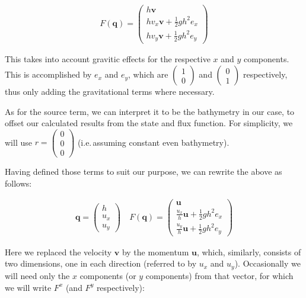 \documentclass{article}
\begin{document}
\begin{eqnarray*}
  F(\mathbf{q}) =
  \begin{pmatrix}
    h \mathbf{v} \\ h v_x \mathbf{v} + \frac{1}{2} g h^2 e_x \\ h v_y \mathbf{v} + \frac{1}{2} g h^2 e_y
  \end{pmatrix}
\end{eqnarray*}

This takes into account gravitic effects for the respective $x$ and $y$ components. This is accomplished by $e_x$ and $e_y$, which are $\begin{pmatrix} 1 \\ 0 \end{pmatrix}$ and $\begin{pmatrix} 0 \\ 1 \end{pmatrix}$ respectively, thus only adding the gravitational terms where necessary.

As for the source term, we can interpret it to be the bathymetry in our case, to offset our calculated results from the state and flux function. For simplicity, we will use $r=
\begin{pmatrix}
  0 \\ 0\\ 0
\end{pmatrix}$ (i.e.\,assuming constant even bathymetry).

Having defined those terms to suit our purpose, we can rewrite the above as follows:

\begin{eqnarray*}
  \label{eqn:shallow-water-flux}
  \mathbf{q} =
  \begin{pmatrix}
    h \\ u_x \\ u_y
  \end{pmatrix} \quad
  F(\mathbf{q}) =
  \begin{pmatrix}
    \mathbf{u} \\ \frac{u_x}{h}\mathbf{u} + \frac{1}{2} g h^2 e_x \\ \frac{u_y}{h}\mathbf{u} + \frac{1}{2} g h^2 e_y
  \end{pmatrix}
\end{eqnarray*}

Here we replaced the velocity $\mathbf{v}$ by the momentum $\mathbf{u}$, which, similarly, consists of two dimensions, one in each direction (referred to by $u_x$ and $u_y$). Occasionally we will need only the $x$ components (or $y$ components) from that vector, for which we will write $F^x$ (and $F^y$ respectively):
\end{document}
